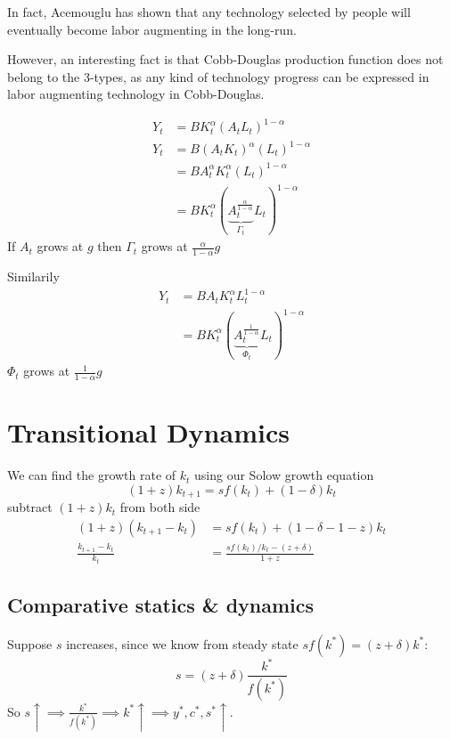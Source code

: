 \documentclass[twocolumn, fleqn]{article}
\begin{document}
			In fact, Acemouglu has shown that any technology selected by people will eventually become labor augmenting in the long-run.

			However, an interesting fact is that Cobb-Douglas production function does not belong to the
			3-types, as any kind of technology progress can be expressed in labor augmenting technology in
			Cobb-Douglas.

			\begin{align*}
				Y_t &= B K_t^{\alpha}(A_t L_t )^{1-\alpha}\\
				Y_t &= B (A_t K_t)^{\alpha}(L_t )^{1-\alpha}\\
				&= B A_t^{\alpha} K_t^{\alpha}(L_t )^{1-\alpha}\\
				&= B K_t^{\alpha} (\underbrace{A_t^{\frac{\alpha}{1-\alpha}}}_{\Gamma_t}L_t)^{1-\alpha}
			\end{align*}
			If $A_t$ grows at $g$ then $\Gamma_t$ grows at $\frac{\alpha}{1-\alpha}g$

			Similarily
			\begin{align*}
				Y_t &= B A_t K_t^{\alpha}L_t^{1-\alpha}\\
				&= B K_t^{\alpha}(\underbrace{A_t^{\frac{1}{1-\alpha}}}_{\Phi_t}L_t)^{1-\alpha}
			\end{align*}
			$\Phi_t$ grows at $\frac{1}{1-\alpha}g$

	\section{Transitional Dynamics}
		We can find the growth rate of $k_t$ using our Solow growth equation
		\[(1+z)k_{t+1}=s f(k_t)+(1-\delta)k_t\]
		subtract $(1+z)k_t$ from both side
		\begin{align*}
		(1+z)(k_{t+1}-k_t) &= s f(k_t)+(1-\delta-1-z)k_t\\[4pt]
		\frac{k_{t+1}-k_t}{k_t}&=\frac{s f(k_t)/k_t - (z+\delta)}{1+z}
		\end{align*}

		\subsection{Comparative statics \& dynamics}
			Suppose $s$ increases, since we know from steady state $sf(k^\ast)=(z+\delta)k^\ast$:
			\[s = (z+\delta)\frac{k^\ast}{f(k^\ast)}\]
			So $s\uparrow \implies \frac{k^\ast}{f(k^\ast)} \implies k^\ast \uparrow \implies y^\ast, c^\ast, s^\ast \uparrow$.\\
\end{document}
